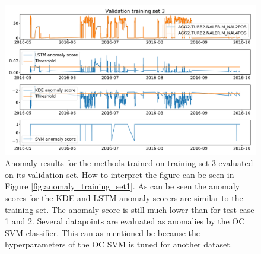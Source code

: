     \begin{figure}
        \centering
        \includegraphics[width=\textwidth]{report/figures/analysis/plant2_train_long/test_data_anomaly.png}
        \caption{Anomaly results for the methods trained on training set 3 evaluated on its validation set. How to interpret the figure can be seen in Figure \ref{fig:anomaly_training_set1}. As can be seen the anomaly scores for the KDE and LSTM anomaly scorers are similar to the training set. The anomaly score is still much lower than for test case 1 and 2. Several datapoints are evaluated as anomalies by the OC SVM classifier. This can as mentioned be because the hyperparameters of the OC SVM is tuned for another dataset.}
    \end{figure}
    
    
    
